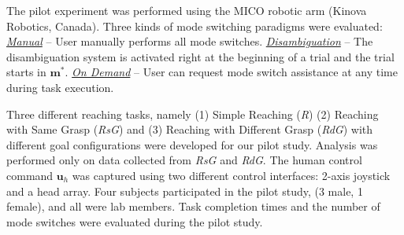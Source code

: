\documentclass[conference]{IEEEtran}
\begin{document}
The pilot experiment was performed using the MICO robotic arm (Kinova Robotics, Canada).
Three kinds of mode switching paradigms were evaluated:
\noindent\underline{\textit{Manual}} -- User manually performs all mode switches. \noindent\underline{\textit{Disambiguation}} -- The disambiguation system is activated right at the beginning of a trial and the trial starts in $\boldsymbol{m}^*$.  \noindent\underline{\textit{On Demand}} -- User can request mode switch assistance at any time during task execution.

Three different reaching tasks, namely (1) Simple Reaching (\textit{R}) (2) Reaching with Same Grasp (\textit{RsG}) and (3) Reaching with Different Grasp (\textit{RdG}) with different goal configurations were developed for our pilot study.
%
%
%
Analysis was performed only on data collected from \textit{RsG} and \textit{RdG}. The human control command $\boldsymbol{u}_h$ was captured using two different control interfaces: 2-axis joystick and a head array.
Four subjects participated in the pilot study, (3 male, 1 female), and all were lab members.  
Task completion times and the number of mode switches were evaluated during the pilot study. 
\end{document}
